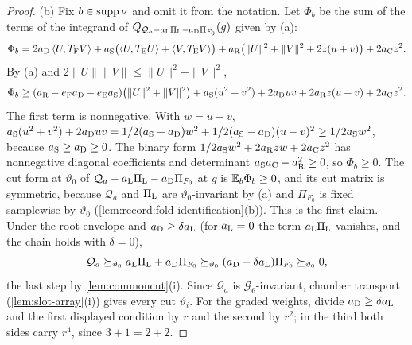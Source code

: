 \begin{proof}
(b) Fix $b\in\supp\nu$ and omit it from the notation. Let $\Phi_b$ be the sum of
the terms of the integrand of $Q_{\mathcal Q_a-a_{\rm L}\Pi_{\rm L}-a_{\rm D}\Pi_{F_0}}(g)$
given by (a):
\[
 \Phi_b=2a_{\rm D}\ip U{T_{\rm F}V}+a_{\rm S}\bigl(\ip U{T_{\rm E}U}+\ip V{T_{\rm E}V}\bigr)
 +a_{\rm R}\bigl(\|U\|^2+\|V\|^2+2z(u+v)\bigr)+2a_{\rm C}z^2 .
\]
By (a) and $2\|U\|\|V\|\le\|U\|^2+\|V\|^2$,
\[
 \Phi_b\ge(a_{\rm R}-e_{\rm F}a_{\rm D}-e_{\rm E}a_{\rm S})\bigl(\|U\|^2+\|V\|^2\bigr)
 +a_{\rm S}(u^2+v^2)+2a_{\rm D}uv+2a_{\rm R}z(u+v)+2a_{\rm C}z^2 .
\]
The first term is nonnegative. With $w=u+v$,
$a_{\rm S}(u^2+v^2)+2a_{\rm D}uv=\frac12(a_{\rm S}+a_{\rm D})w^2
+\frac12(a_{\rm S}-a_{\rm D})(u-v)^2\ge\frac12a_{\rm S}w^2$, because
$a_{\rm S}\ge a_{\rm D}\ge0$. The binary form
$\frac12a_{\rm S}w^2+2a_{\rm R}zw+2a_{\rm C}z^2$ has nonnegative diagonal
coefficients and determinant $a_{\rm S}a_{\rm C}-a_{\rm R}^2\ge0$, so
$\Phi_b\ge0$. The cut form at $\vartheta_0$ of
$\mathcal Q_a-a_{\rm L}\Pi_{\rm L}-a_{\rm D}\Pi_{F_0}$ at $g$ is $\E_b\Phi_b\ge0$,
and its cut matrix is symmetric, because $\mathcal Q_a$ and $\Pi_{\rm L}$ are
$\vartheta_0$-invariant by (a) and $\Pi_{F_0}$ is fixed samplewise by
$\vartheta_0$ (\cref{lem:record:fold-identification}(b)). This is the first
claim. Under the root envelope and $a_{\rm D}\ge\delta a_{\rm L}$ (for
$a_{\rm L}=0$ the term $a_{\rm L}\Pi_{\rm L}$ vanishes, and the chain holds with
$\delta=0$),
\[
 \mathcal Q_a\succeq_{\vartheta_0}a_{\rm L}\Pi_{\rm L}+a_{\rm D}\Pi_{F_0}
 \succeq_{\vartheta_0}(a_{\rm D}-\delta a_{\rm L})\Pi_{F_0}\succeq_{\vartheta_0}0,
\]
the last step by \cref{lem:commoncut}(i). Since $\mathcal Q_a$ is
$\mathcal G_6$-invariant, chamber transport (\cref{lem:slot-array}(i))
gives every cut $\vartheta_i$. For the graded weights, divide
$a_{\rm D}\ge\delta a_{\rm L}$ and the first displayed condition by $r$ and the
second by $r^2$; in the third both sides carry $r^4$, since $3+1=2+2$.


\end{proof}
